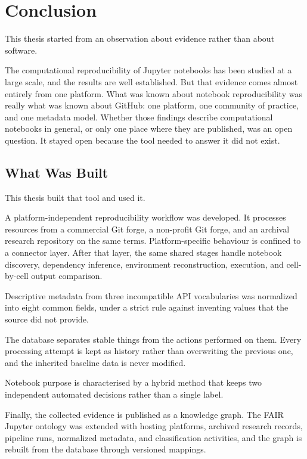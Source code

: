\chapter{Conclusion}
\label{chap:conclusion}

This thesis started from an observation about evidence rather than about software.

The computational reproducibility of Jupyter notebooks has been studied at a large scale, and the results are well established. But that evidence comes almost entirely from one platform. What was known about notebook reproducibility was really what was known about GitHub: one platform, one community of practice, and one metadata model. Whether those findings describe computational notebooks in general, or only one place where they are published, was an open question. It stayed open because the tool needed to answer it did not exist.

\section{What Was Built}

This thesis built that tool and used it.

A platform-independent reproducibility workflow was developed. It processes resources from a commercial Git forge, a non-profit Git forge, and an archival research repository on the same terms. Platform-specific behaviour is confined to a connector layer. After that layer, the same shared stages handle notebook discovery, dependency inference, environment reconstruction, execution, and cell-by-cell output comparison.

Descriptive metadata from three incompatible API vocabularies was normalized into eight common fields, under a strict rule against inventing values that the source did not provide.

The database separates stable things from the actions performed on them. Every processing attempt is kept as history rather than overwriting the previous one, and the inherited baseline data is never modified.

Notebook purpose is characterised by a hybrid method that keeps two independent automated decisions rather than a single label.

Finally, the collected evidence is published as a knowledge graph. The FAIR Jupyter ontology was extended with hosting platforms, archived research records, pipeline runs, normalized metadata, and classification activities, and the graph is rebuilt from the database through versioned mappings.


